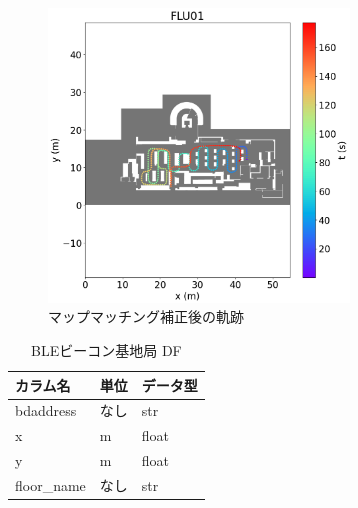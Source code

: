 \begin{figure}[h]
	\centering
	\includegraphics[width=80mm]{image/map-matching.png}
	\caption{マップマッチング補正後の軌跡}    \label{fig:map-matching}
\end{figure}


\begin{table}[h]
	\centering
	\begin{tabular}{lll}
		\toprule
		カラム名        & 単位 & データ型  \\
		\midrule
		bdaddress   & なし & str   \\
		x           & m  & float \\
		y           & m  & float \\
		floor\_name & なし & str   \\
		\bottomrule
	\end{tabular}
	\caption{BLEビーコン基地局 DF}
\end{table}
